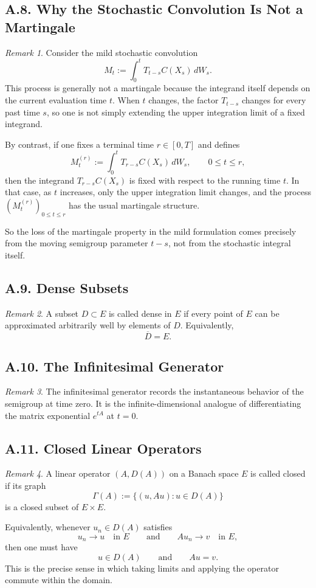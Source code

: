 \documentclass[11pt]{article}
\theoremstyle{definition}
\theoremstyle{remark}
\newtheorem{remark}{Remark}
\begin{document}
\subsection*{A.8. Why the Stochastic Convolution Is Not a Martingale}
\begin{remark}
Consider the mild stochastic convolution
\[
M_t:=\int_0^t T_{t-s}C(X_s)\,dW_s.
\]
This process is generally not a martingale because the integrand itself depends on the current evaluation time \(t\). When \(t\) changes, the factor \(T_{t-s}\) changes for every past time \(s\), so one is not simply extending the upper integration limit of a fixed integrand.

By contrast, if one fixes a terminal time \(r\in[0,T]\) and defines
\[
M_t^{(r)}:=\int_0^t T_{r-s}C(X_s)\,dW_s,
\qquad 0\le t\le r,
\]
then the integrand \(T_{r-s}C(X_s)\) is fixed with respect to the running time \(t\). In that case, as \(t\) increases, only the upper integration limit changes, and the process \((M_t^{(r)})_{0\le t\le r}\) has the usual martingale structure.

So the loss of the martingale property in the mild formulation comes precisely from the moving semigroup parameter \(t-s\), not from the stochastic integral itself.
\end{remark}

\subsection*{A.9. Dense Subsets}
\begin{remark}
A subset \(D\subset E\) is called dense in \(E\) if every point of \(E\) can be approximated arbitrarily well by elements of \(D\). Equivalently,
\[
\overline{D}=E.
\]
\end{remark}

\subsection*{A.10. The Infinitesimal Generator}
\begin{remark}
The infinitesimal generator records the instantaneous behavior of the semigroup at time zero. It is the infinite-dimensional analogue of differentiating the matrix exponential \(e^{tA}\) at \(t=0\).
\end{remark}

\subsection*{A.11. Closed Linear Operators}
\begin{remark}
A linear operator \((A,D(A))\) on a Banach space \(E\) is called closed if its graph
\[
\Gamma(A):=\{(u,Au):u\in D(A)\}
\]
is a closed subset of \(E\times E\).

Equivalently, whenever \(u_n\in D(A)\) satisfies
\[
u_n\to u \quad \text{in } E
\qquad \text{and} \qquad
Au_n\to v \quad \text{in } E,
\]
then one must have
\[
u\in D(A)
\qquad \text{and} \qquad
Au=v.
\]
This is the precise sense in which taking limits and applying the operator commute within the domain.
\end{remark}
\end{document}
